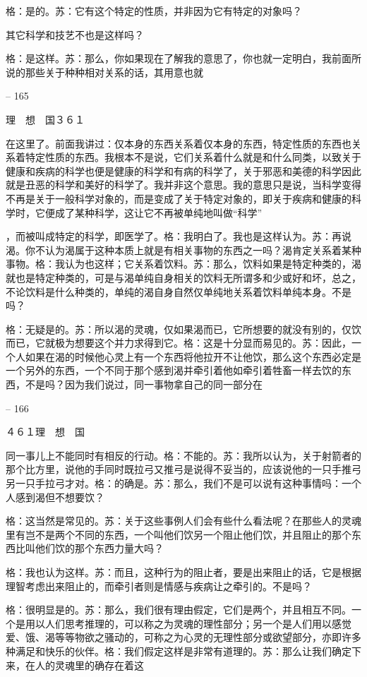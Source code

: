 \documentclass[11pt,oneside]{book}
\begin{document}
\begin{common-format}
    格：是的。苏：它有这个特定的性质，并非因为它有特定的对象吗？

    其它科学和技艺不也是这样吗？

    格：是这样。苏：那么，你如果现在了解我的意思了，你也就一定明白，我前面所说的那些关于种种相对关系的话，其用意也就

    

-- 165

    理　想　国３６１

    在这里了。前面我讲过：仅本身的东西关系着仅本身的东西，特定性质的东西也关系着特定性质的东西。我根本不是说，它们关系着什么就是和什么同类，以致关于健康和疾病的科学也便是健康的科学和有病的科学了，关于邪恶和美德的科学因此就是丑恶的科学和美好的科学了。我并非这个意思。我的意思只是说，当科学变得不再是关于一般科学对象的，而是变成了关于特定对象的，即关于疾病和健康的科学时，它便成了某种科学，这让它不再被单纯地叫做“科学”

    ，而被叫成特定的科学，即医学了。格：我明白了。我也是这样认为。苏：再说渴。你不认为渴属于这种本质上就是有相关事物的东西之一吗？渴肯定关系着某种事物。格：我认为也这样；它关系着饮料。苏：那么，饮料如果是特定种类的，渴就也是特定种类的，可是与渴单纯自身相关的饮料无所谓多和少或好和坏，总之，不论饮料是什么种类的，单纯的渴自身自然仅单纯地关系着饮料单纯本身。不是吗？

    格：无疑是的。苏：所以渴的灵魂，仅如果渴而已，它所想要的就没有别的，仅饮而已，它就极为想要这个并力求得到它。格：这是十分显而易见的。苏：因此，一个人如果在渴的时候他心灵上有一个东西将他拉开不让他饮，那么这个东西必定是一个另外的东西，一个不同于那个感到渴并牵引着他如牵引着牲畜一样去饮的东西，不是吗？因为我们说过，同一事物拿自己的同一部分在

    

-- 166

    ４６１理　想　国

    同一事儿上不能同时有相反的行动。格：不能的。苏：我所以认为，关于射箭者的那个比方里，说他的手同时既拉弓又推弓是说得不妥当的，应该说他的一只手推弓另一只手拉弓才对。格：的确是。苏：那么，我们不是可以说有这种事情吗：一个人感到渴但不想要饮？

    格：这当然是常见的。苏：关于这些事例人们会有些什么看法呢？在那些人的灵魂里有岂不是两个不同的东西，一个叫他们饮另一个阻止他们饮，并且阻止的那个东西比叫他们饮的那个东西力量大吗？

    格：我也认为这样。苏：而且，这种行为的阻止者，要是出来阻止的话，它是根据理智考虑出来阻止的，而牵引者则是情感与疾病让之牵引的。不是吗？

    格：很明显是的。苏：那么，我们很有理由假定，它们是两个，并且相互不同。一个是用以人们思考推理的，可以称之为灵魂的理性部分；另一个是人们用以感觉爱、饿、渴等等物欲之骚动的，可称之为心灵的无理性部分或欲望部分，亦即许多种满足和快乐的伙伴。格：我们假定这样是非常有道理的。苏：那么让我们确定下来，在人的灵魂里的确存在着这


\end{common-format}
\end{document}
